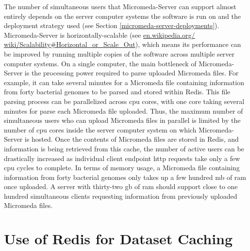 The number of simultaneous users that Micromeda-Server can support almost entirely depends on the server computer systems the software is run on and the deployment strategy used (see Section \ref{micromeda-server-deployments}).
Micromeda-Server is horizontally-scalable (see \href{https://en.wikipedia.org/wiki/Scalability#Horizontal_or_Scale_Out}{en.wikipedia.org/ wiki/Scalability\#Horizontal\_or\_Scale\_Out}), which means its performance can be 
improved by running multiple copies of the software across multiple server computer systems. On 
a single computer, the main bottleneck of Micromeda-Server is the processing 
power required to parse uploaded Micromeda files. For example, it can take 
several minutes for a Micromeda file containing information from forty bacterial 
genomes to be parsed and stored within Redis. This file parsing process can be 
parallelized across \gls{cpu} cores, with one core taking several minutes for 
parse each Micromeda file uploaded. Thus, the maximum number of simultaneous 
users who can upload Micromeda files in parallel is limited by the number of 
\gls{cpu} cores inside the server computer system on which Micromeda-Server is 
hosted. Once the contents of Micromeda files are stored in Redis, and 
information is being retrieved from this cache, the number of active users can 
be drastically increased as individual client endpoint \gls{http} requests take 
only a few \gls{cpu} cycles to complete. In terms of memory usage, a Micromeda 
file containing information from forty bacterial genomes only takes up a few 
hundred \gls{mb} of \gls{ram} once uploaded. A server with thirty-two \gls{gb} 
of \gls{ram} should support close to one hundred simultaneous clients requesting 
information from previously uploaded Micromeda files.

\section{Use of Redis for Dataset Caching} \label{redis-caching}

